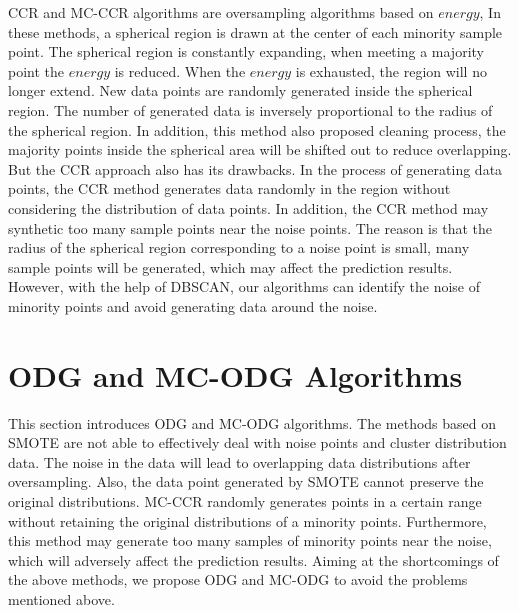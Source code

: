 \documentclass[runningheads]{llncs}
\begin{document}
CCR \cite{2017CCR} and MC-CCR \cite{2020Combined} algorithms are oversampling algorithms based on $energy$,
In these methods, a spherical region is drawn at the center of each minority sample point. 
The spherical region is constantly expanding, when meeting a majority point the $energy$ is reduced.
When the $energy$ is exhausted, the region will no longer extend.
New data points are randomly generated inside the spherical region. 
The number of generated data is inversely proportional to the radius of the spherical region.
In addition, this method also proposed cleaning process, 
the majority points inside the spherical area will be shifted out to reduce overlapping.
But the CCR approach also has its drawbacks. In the process of generating data points,
the CCR method generates data randomly in the region without considering the distribution of data points.
In addition, the CCR method may synthetic too many sample points near the noise points. 
The reason is that the radius of the spherical region corresponding 
to a noise point is small, 
many sample points will be generated, which may affect the prediction results.
However, with the help of DBSCAN, our algorithms can identify the noise of minority points and 
avoid generating data around the noise.


\section{ODG and MC-ODG Algorithms}
This section introduces ODG and MC-ODG algorithms.
The methods based on SMOTE are not able to effectively deal with noise points and cluster distribution data.
The noise in the data will lead to overlapping data distributions after oversampling.
Also, the data point generated by SMOTE cannot preserve the original distributions.
MC-CCR randomly generates points in a certain range without retaining the original distributions of a minority points.
Furthermore, this method may generate too many samples of 
minority points near the noise, which will adversely affect the prediction results.
Aiming at the shortcomings of the above methods, 
we propose ODG and MC-ODG to avoid the problems mentioned above.
\end{document}
